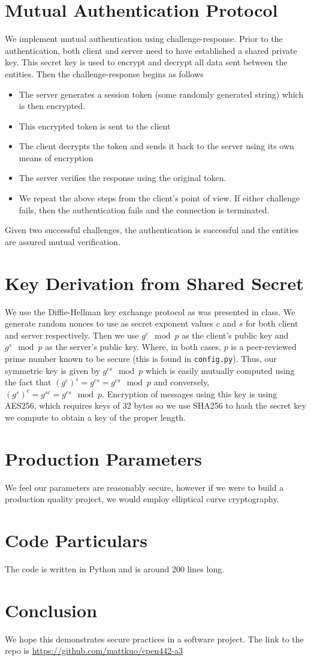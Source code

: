 \documentclass[conference]{IEEEtran}
\begin{document}
\section{Mutual Authentication Protocol}
We implement mutual authentication using challenge-response. Prior to the authentication, both client and server need to have established a shared private key. This secret key is used to encrypt and decrypt all data sent between the entities. Then the challenge-response begins as follows
\begin{itemize}
	\item The server generates a session token (some randomly generated string) which is then encrypted. 
	\item This encrypted token is sent to the client
	\item The client decrypts the token and sends it back to the server using its own means of encryption
	\item The server verifies the response using the original token.
	\item We repeat the above steps from the client's point of view. If either challenge fails, then the authentication fails and the connection is terminated. 
\end{itemize}
Given two successful challenges, the authentication is successful and the entities are assured mutual verification. 
\section{Key Derivation from Shared Secret}
We use the Diffie-Hellman key exchange protocol as was presented in class. We generate random nonces to use as secret exponent values $c$ and $s$ for both client and server respectively. Then we use $g^c\mod p$ as the client's public key and $g^s\mod p$ as the server's public key. Where, in both cases, $p$ is a peer-reviewed prime number known to be secure (this is found in {\tt config.py}). 
Thus, our symmetric key is given by $g^{cs}\mod p$ which is easily mutually computed using the fact that $(g^c)^s = g^{cs} = g^{cs}\mod p$ and conversely, $(g^s)^c = g^{sc} = g^{cs}\mod p$. Encryption of messages using this key is using AES256, which requires keys of 32 bytes so we use SHA256 to hash the secret key we compute to obtain a key of the proper length.
\section{Production Parameters}
We feel our parameters are reasonably secure, however if we were to build a production quality project, we would employ elliptical curve cryptography. 
\section{Code Particulars}
The code is written in Python and is around 200 lines long.



\section{Conclusion}
We hope this demonstrates secure practices in a software project. The link to the repo is \url{https://github.com/mattkuo/cpen442-a3}


\end{document}
